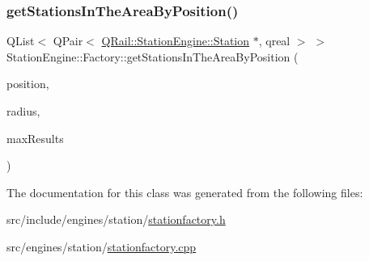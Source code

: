 \subsubsection{\texorpdfstring{getStationsInTheAreaByPosition()}{getStationsInTheAreaByPosition()}}
{\footnotesize\ttfamily Q\+List$<$ Q\+Pair$<$ \mbox{\hyperlink{classQRail_1_1StationEngine_1_1Station}{Q\+Rail\+::\+Station\+Engine\+::\+Station}} $\ast$, qreal $>$ $>$ Station\+Engine\+::\+Factory\+::get\+Stations\+In\+The\+Area\+By\+Position (\begin{DoxyParamCaption}\item[{const Q\+Geo\+Coordinate \&}]{position,  }\item[{const qreal \&}]{radius,  }\item[{const quint32 \&}]{max\+Results }\end{DoxyParamCaption})}



The documentation for this class was generated from the following files\+:\begin{DoxyCompactItemize}
\item 
src/include/engines/station/\mbox{\hyperlink{stationfactory_8h}{stationfactory.\+h}}\item 
src/engines/station/\mbox{\hyperlink{stationfactory_8cpp}{stationfactory.\+cpp}}\end{DoxyCompactItemize}
